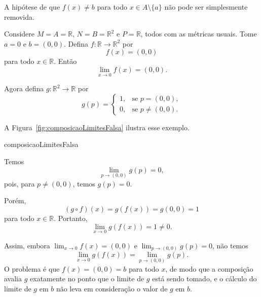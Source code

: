 \begin{example}\label{ex:composicaoLimitesFalsa}
    A hipótese de que $f(x)\neq b$ para todo $x\in A\setminus\{a\}$ não pode ser simplesmente removida.

    Considere $M=A=\mathbb R$, $N=B=\mathbb R^2$ e $P=\mathbb R$, todos com as métricas usuais.
    Tome $a=0$ e $b=(0,0)$.
    Defina $f:\mathbb R\to\mathbb R^2$ por
    \[
        f(x)=(0,0)
    \]
    para todo $x\in\mathbb R$.
    Então
    \[
        \lim_{x\to 0} f(x)=(0,0).
    \]

    Agora defina $g:\mathbb R^2\to\mathbb R$ por
    \[
        g(p)=
        \begin{cases}
            1, & \text{se } p=(0,0),\\
            0, & \text{se } p\neq (0,0).
        \end{cases}
    \]

    A Figura~\ref{fig:composicaoLimitesFalsa} ilustra esse exemplo.

    {composicaoLimitesFalsa}

    Temos
    \[
        \lim_{p\to (0,0)} g(p)=0,
    \]
    pois, para $p\neq (0,0)$, temos $g(p)=0$.

    Porém,
    \[
        (g\circ f)(x)=g(f(x))=g(0,0)=1
    \]
    para todo $x\in\mathbb R$.
    Portanto,
    \[
        \lim_{x\to 0} g(f(x))=1\neq 0.
    \]

    Assim, embora $\lim_{x\to 0} f(x)=(0,0)$ e $\lim_{p\to (0,0)} g(p)=0$, não temos
    \[
        \lim_{x\to 0} g(f(x))=\lim_{p\to (0,0)} g(p).
    \]
    O problema é que $f(x)=(0,0)=b$ para todo $x$, de modo que a composição avalia $g$ exatamente no ponto que o limite de $g$ está sendo tomado, e o cálculo do limite de $g$ em $b$ não leva em consideração o valor de $g$ em $b$.
\end{example}

